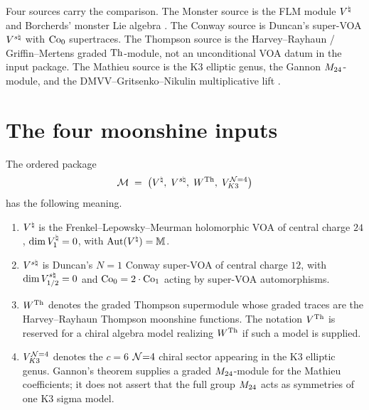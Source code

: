 Four sources carry the comparison.  The Monster source is the FLM
module $V^{\natural}$ and Borcherds' monster Lie algebra
\cite{FLM88,Bor92}.  The Conway source is Duncan's super-VOA
$V^{s\natural}$ with $\mathrm{Co}_0$ supertraces.  The Thompson source is the
Harvey--Rayhaun / Griffin--Mertens graded $\mathrm{Th}$-module, not an
unconditional VOA datum in the input package.  The Mathieu source is
the K3 elliptic genus, the Gannon $M_{24}$-module, and the
DMVV--Gritsenko--Nikulin multiplicative lift
\cite{Gannon16,DMVV,GritsenkoNikulin97}.

\section{The four moonshine inputs}
\label{sec:moonshine-setup}

\begin{definition}
\label{def:moonshine-four-families}
The ordered package
\[
 \mathcal M
 \;=\;
 \bigl(V^{\natural},\;V^{s\natural},\;W^{\mathrm{Th}},\;V_{K3}^{\mathcal N{=}4}\bigr)
\]
has the following meaning.
\begin{enumerate}[label=\textup{(\arabic*)}]
\item $V^{\natural}$ is the Frenkel--Lepowsky--Meurman holomorphic VOA of
central charge $24$, $\dim V^{\natural}_1=0$, with
$\operatorname{Aut}(V^{\natural})=\mathbb M$.
\item $V^{s\natural}$ is Duncan's $N{=}1$ Conway super-VOA of central charge
$12$, with $\dim V^{s\natural}_{1/2}=0$ and $\mathrm{Co}_0=2\cdot\mathrm{Co}_1$ acting by
super-VOA automorphisms.
\item $W^{\mathrm{Th}}$ denotes the graded Thompson supermodule whose graded
traces are the Harvey--Rayhaun Thompson moonshine functions.  The
notation $V^{\mathrm{Th}}$ is reserved for a chiral algebra model realizing
$W^{\mathrm{Th}}$ if such a model is supplied.
\item $V_{K3}^{\mathcal N{=}4}$ denotes the $c=6$ $\mathcal N{=}4$ chiral sector appearing
in the K3 elliptic genus.  Gannon's theorem supplies a graded
$M_{24}$-module for the Mathieu coefficients; it does not assert that
the full group $M_{24}$ acts as symmetries of one K3 sigma model.
\end{enumerate}
\end{definition}

